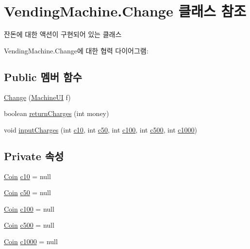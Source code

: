 \hypertarget{class_vending_machine_1_1_change}{}\section{Vending\+Machine.\+Change 클래스 참조}
\label{class_vending_machine_1_1_change}


잔돈에 대한 액션이 구현되어 있는 클래스  




Vending\+Machine.\+Change에 대한 협력 다이어그램\+:
\subsection*{Public 멤버 함수}
\begin{DoxyCompactItemize}
\item 
\hyperlink{class_vending_machine_1_1_change_a2fe86cac373243c9ecb318d1049278f2}{Change} (\hyperlink{class_vending_machine_1_1_machine_u_i}{Machine\+UI} f)
\item 
boolean \hyperlink{class_vending_machine_1_1_change_af8f68fb27a3560f4972cc498b914d2c3}{return\+Charges} (int money)
\item 
void \hyperlink{class_vending_machine_1_1_change_a47e92d2372d5b1f2a3e948ee4f55d884}{input\+Charges} (int \hyperlink{class_vending_machine_1_1_change_ae87669bca1d7b445ee8666d2acf49db8}{c10}, int \hyperlink{class_vending_machine_1_1_change_ae6535f613cfce78eb2e8c8b246c81aea}{c50}, int \hyperlink{class_vending_machine_1_1_change_aac8dc9b43a91d521a6db9680625aba6e}{c100}, int \hyperlink{class_vending_machine_1_1_change_a249122ed59018ac11a88b1644ba214d3}{c500}, int \hyperlink{class_vending_machine_1_1_change_ae3e92935c527ac2d76998fa6a7560804}{c1000})
\end{DoxyCompactItemize}
\subsection*{Private 속성}
\begin{DoxyCompactItemize}
\item 
\hyperlink{class_vending_machine_1_1_coin}{Coin} \hyperlink{class_vending_machine_1_1_change_ae87669bca1d7b445ee8666d2acf49db8}{c10} = null
\item 
\hyperlink{class_vending_machine_1_1_coin}{Coin} \hyperlink{class_vending_machine_1_1_change_ae6535f613cfce78eb2e8c8b246c81aea}{c50} = null
\item 
\hyperlink{class_vending_machine_1_1_coin}{Coin} \hyperlink{class_vending_machine_1_1_change_aac8dc9b43a91d521a6db9680625aba6e}{c100} = null
\item 
\hyperlink{class_vending_machine_1_1_coin}{Coin} \hyperlink{class_vending_machine_1_1_change_a249122ed59018ac11a88b1644ba214d3}{c500} = null
\item 
\hyperlink{class_vending_machine_1_1_coin}{Coin} \hyperlink{class_vending_machine_1_1_change_ae3e92935c527ac2d76998fa6a7560804}{c1000} = null
\end{DoxyCompactItemize}


